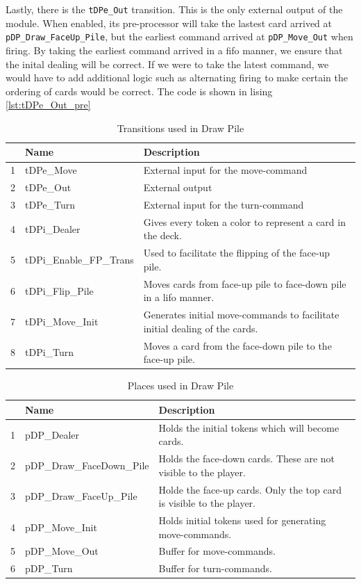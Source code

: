 \documentclass[runningheads,a4paper]{llncs}
\newcommand{\GPenSIM}{../GPenSIM}
\begin{document}
Lastly, there is the \verb!tDPe_Out! transition. This is the only external output of the module. When enabled, its pre-processor will take the lastest card arrived at \verb!pDP_Draw_FaceUp_Pile!, but the earliest command arrived at \verb!pDP_Move_Out! when firing. By taking the earliest command arrived in a \ac{fifo} manner, we ensure that the inital dealing will be correct. If we were to take the latest command, we would have to add additional logic such as alternating firing to make certain the ordering of cards would be correct. The code is shown in lising \ref{lst:tDPe_Out_pre}

\begin{table}
	\caption{Transitions used in Draw Pile}
	\begin{tabular}{|l|l|l|}
		\hline
		& Name & Description \\
		\hline
		1  & tDPe\_Move               &   External input for the move-\ac{command} \\ \hline
		2  & tDPe\_Out                &   External output \\ \hline
		3  & tDPe\_Turn               &   External input for the turn-\ac{command} \\ \hline
		4  & tDPi\_Dealer             &   Gives every token a color to represent a card in the deck. \\ \hline
		5  & tDPi\_Enable\_FP\_Trans  &   Used to facilitate the flipping of the face-up pile. \\ \hline
		6  & tDPi\_Flip\_Pile         &   Moves cards from face-up pile to face-down pile in a \ac{lifo} manner. \\ \hline
		7  & tDPi\_Move\_Init         &   Generates initial move-commands to facilitate initial dealing of the cards. \\ \hline
		8  & tDPi\_Turn               &   Moves a card from the face-down pile to the face-up pile. \\ \hline
	\end{tabular}
\end{table}
\begin{table}
	\caption{Places used in Draw Pile}
	\begin{tabular}{|l|l|l|}
		\hline
		& Name & Description \\
		\hline
		1  & pDP\_Dealer               & Holds the initial tokens which will become cards. \\ \hline
		2  & pDP\_Draw\_FaceDown\_Pile & Holds the face-down cards. These are not visible to the player. \\ \hline
		3  & pDP\_Draw\_FaceUp\_Pile   & Holde the face-up cards. Only the top card is visible to the player. \\ \hline
		4  & pDP\_Move\_Init           & Holds initial tokens used for generating move-commands. \\ \hline
		5  & pDP\_Move\_Out            & Buffer for move-commands.  \\ \hline
		6  & pDP\_Turn                 & Buffer for turn-commands. \\ \hline
	\end{tabular}
\end{table}
\end{document}
